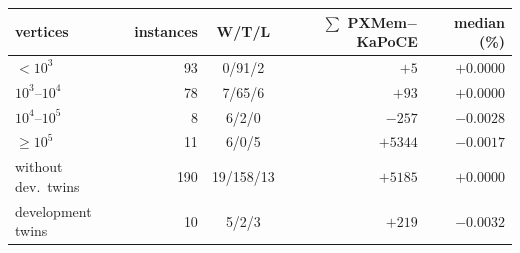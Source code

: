 \begin{tabular}{lrcrr}
\toprule
vertices & instances & W/T/L & $\sum$ PXMem$-$KaPoCE & median (\%) \\
\midrule
$<10^3$ & 93 & 0/91/2 & $+5$ & $+0.0000$ \\
$10^3$--$10^4$ & 78 & 7/65/6 & $+93$ & $+0.0000$ \\
$10^4$--$10^5$ & 8 & 6/2/0 & $-257$ & $-0.0028$ \\
$\ge 10^5$ & 11 & 6/0/5 & $+5344$ & $-0.0017$ \\
\midrule
without dev.\ twins & 190 & 19/158/13 & $+5185$ & $+0.0000$ \\
development twins & 10 & 5/2/3 & $+219$ & $-0.0032$ \\
\bottomrule
\end{tabular}
